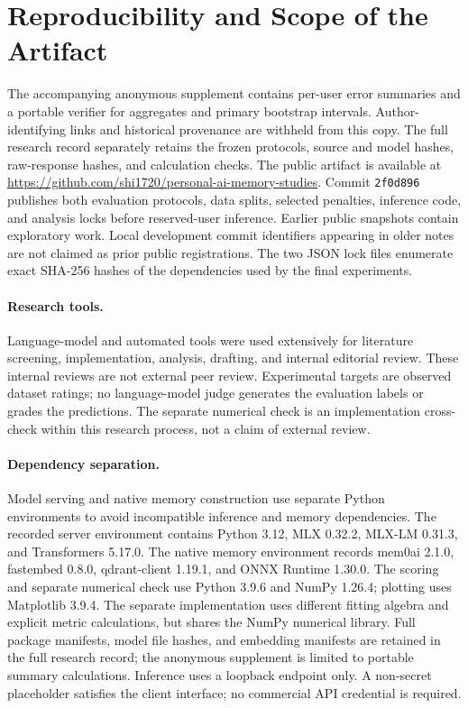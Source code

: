 \section{Reproducibility and Scope of the Artifact}
\label{app:repro}
\ifdefined\anonymouscopy
The accompanying anonymous supplement contains per-user error summaries and a portable verifier for aggregates and primary bootstrap intervals. Author-identifying links and historical provenance are withheld from this copy. The full research record separately retains the frozen protocols, source and model hashes, raw-response hashes, and calculation checks.
\else
The public artifact is available at \url{https://github.com/shi1720/personal-ai-memory-studies}. Commit \texttt{2f0d896} publishes both evaluation protocols, data splits, selected penalties, inference code, and analysis locks before reserved-user inference. Earlier public snapshots contain exploratory work. Local development commit identifiers appearing in older notes are not claimed as prior public registrations. The two JSON lock files enumerate exact SHA-256 hashes of the dependencies used by the final experiments.
\fi

\paragraph{Research tools.} Language-model and automated tools were used extensively for literature screening, implementation, analysis, drafting, and internal editorial review. These internal reviews are not external peer review. Experimental targets are observed dataset ratings; no language-model judge generates the evaluation labels or grades the predictions. The separate numerical check is an implementation cross-check within this research process, not a claim of external review.

\paragraph{Dependency separation.} Model serving and native memory construction use separate Python environments to avoid incompatible inference and memory dependencies. The recorded server environment contains Python 3.12, MLX 0.32.2, MLX-LM 0.31.3, and Transformers 5.17.0. The native memory environment records mem0ai 2.1.0, fastembed 0.8.0, qdrant-client 1.19.1, and ONNX Runtime 1.30.0. The scoring and separate numerical check use Python 3.9.6 and NumPy 1.26.4; plotting uses Matplotlib 3.9.4. The separate implementation uses different fitting algebra and explicit metric calculations, but shares the NumPy numerical library. Full package manifests, model file hashes, and embedding manifests are retained in the full research record; the anonymous supplement is limited to portable summary calculations. Inference uses a loopback endpoint only. A non-secret placeholder satisfies the client interface; no commercial API credential is required.

